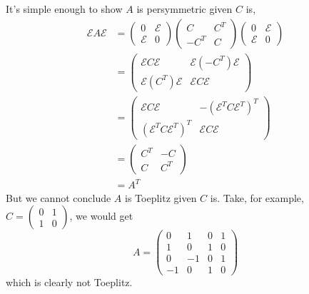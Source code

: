 \documentclass[11pt]{article}
\newcommand{\Eps}{\mathcal{E}}
\begin{document}
\begin{enumerate}
\begin{enumerate}[label=(\alph*)]
		            It's simple enough to show \(A\) is persymmetric given \(C\) is,
		            \begin{align*}
			            \Eps A \Eps & =
			            \begin{pmatrix} 0 & \Eps \\ \Eps & 0 \end{pmatrix}
			            \begin{pmatrix} C & C^T \\ -C^T & C \end{pmatrix}
			            \begin{pmatrix} 0 & \Eps \\ \Eps & 0 \end{pmatrix}
			            \\
			                        & =
			            \begin{pmatrix}
				            \Eps C \Eps & \Eps (-C^T) \Eps \\ \Eps (C^T) \Eps & \Eps C \Eps
			            \end{pmatrix}
			            \\
			                        & =
			            \begin{pmatrix}
				            \Eps C \Eps & -(\Eps^T C \Eps^T)^T \\ (\Eps^T C \Eps^T)^T & \Eps C \Eps
			            \end{pmatrix}
			            \\
			                        & =
			            \begin{pmatrix}
				            C^T & -C \\ C & C^T
			            \end{pmatrix}
			            \\
			                        & = A^T
		            \end{align*}
		            But we cannot conclude \(A\) is Toeplitz given \(C\) is.  Take, for example, \(C = \begin{pmatrix}  0 & 1 \\ 1 & 0 \end{pmatrix}\), we would get \[A = \begin{pmatrix} 0 & 1 & 0 & 1 \\ 1 & 0 & 1 & 0 \\ 0 & -1 & 0 & 1 \\ -1 & 0 & 1 & 0  \end{pmatrix}\]
		            which is clearly not Toeplitz.
	      \end{enumerate}


\end{enumerate}
\end{document}
